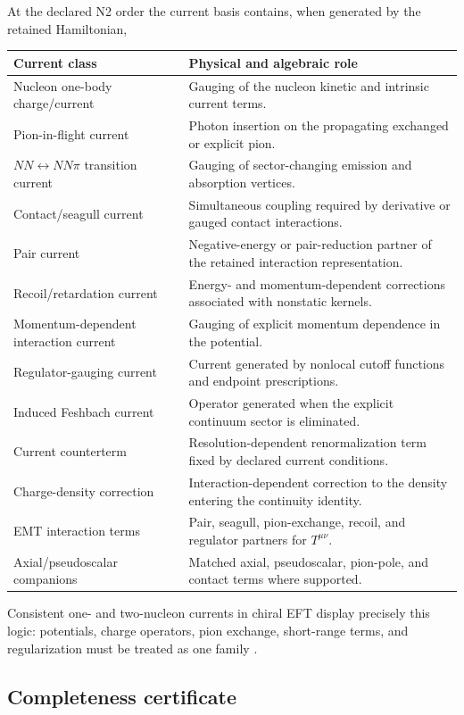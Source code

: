 \documentclass[11pt]{article}
\begin{document}
At the declared N2 order the current basis contains, when generated by the
retained Hamiltonian,
\begin{longtable}{L{0.30\textwidth}L{0.62\textwidth}}
\toprule
Current class & Physical and algebraic role\\
\midrule
\endhead
Nucleon one-body charge/current & Gauging of the nucleon kinetic and intrinsic current terms.\\
Pion-in-flight current & Photon insertion on the propagating exchanged or explicit pion.\\
\(NN\leftrightarrow NN\pi\) transition current & Gauging of sector-changing emission and absorption vertices.\\
Contact/seagull current & Simultaneous coupling required by derivative or gauged contact interactions.\\
Pair current & Negative-energy or pair-reduction partner of the retained interaction representation.\\
Recoil/retardation current & Energy- and momentum-dependent corrections associated with nonstatic kernels.\\
Momentum-dependent interaction current & Gauging of explicit momentum dependence in the potential.\\
Regulator-gauging current & Current generated by nonlocal cutoff functions and endpoint prescriptions.\\
Induced Feshbach current & Operator generated when the explicit continuum sector is eliminated.\\
Current counterterm & Resolution-dependent renormalization term fixed by declared current conditions.\\
Charge-density correction & Interaction-dependent correction to the density entering the continuity identity.\\
EMT interaction terms & Pair, seagull, pion-exchange, recoil, and regulator partners for \(T^{\mu\nu}\).\\
Axial/pseudoscalar companions & Matched axial, pseudoscalar, pion-pole, and contact terms where supported.\\
\bottomrule
\end{longtable}
Consistent one- and two-nucleon currents in chiral EFT display precisely this
logic: potentials, charge operators, pion exchange, short-range terms, and
regularization must be treated as one family
\cite{Pastore2009,Koelling2009,Koelling2011,Krebs2020,Pastore2011}.

\subsection{Completeness certificate}
\end{document}
